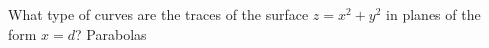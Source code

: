 {What type of curves are the traces of the surface $z=x^2+y^2$ in planes of the form $x=d$?
}
{Parabolas
}
